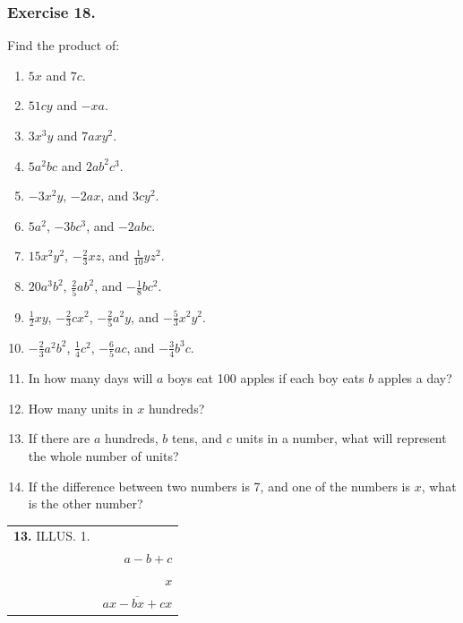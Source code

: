 \documentclass{book}
\begin{document}
\subsubsection*{Exercise 18.}

Find the product of:
\begin{enumerate}
\item $5x$ and $7c$.

\item $51cy$ and $-xa$.

\item $3x^{3}y$ and $7axy^{2}$.

\item $5a^{2}bc$ and $2ab^{2}c^{3}$.

\item $-3x^{2}y$, $-2ax$, and $3cy^{2}$.

\item $5a^{2}$, $-3bc^{3}$, and $-2abc$.

\item $15x^{2}y^{2}$, $-\frac{2}{3} xz$, and $\frac{1}{10}
yz^{2}$.

\item $20a^{3}b^{2}$, $\frac{2}{5} ab^{2}$, and $-\frac{1}{8}
bc^{2}$.

\item $\frac{1}{2} xy$, $-\frac{2}{3} cx^{2}$, $-\frac{2}{5}
a^{2}y$, and $-\frac{5}{3} x^{2}y^{2}$.

\item $-\frac{2}{3} a^{2}b^{2}$, $\frac{1}{4} c^{2}$,
$-\frac{6}{5}ac$, and $-\frac{3}{4} b^{3}c$.

\item In how many days will $a$ boys eat 100 apples if each boy
eats $b$ apples a day?

\item How many units in $x$ hundreds?

\item If there are $a$ hundreds, $b$ tens, and $c$ units in a
number, what will represent the whole number of units?

\item If the difference between two numbers is 7, and one of the
numbers is $x$, what is the other number?
\end{enumerate}

\begin{tabular}{cr}
\textbf{13.} ILLUS. 1.&\\
&$a - b  + c$\\
& $x$\\
&$\overline{ax-bx+cx}$
\end{tabular}
\end{document}
